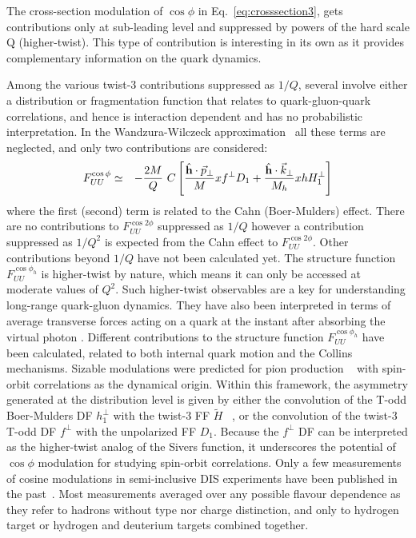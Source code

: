 \documentclass[aps,prl,twocolumn,showpacs,superscriptaddress,groupedaddress]{revtex4}  %
\newcommand{\FUUc}{F_{UU}^{\cos\phi}}
\newcommand{\FUUcc}{F_{UU}^{\cos2\phi}}
\newcommand{\kt}{\vec{k}_\perp}
\newcommand{\pt}{\vec{p}_\perp}
\newcommand{\ph}{\phi_h}
\begin{document}
The cross-section modulation of  $\cos \phi $ in Eq.~\ref{eq:crosssection3}, gets contributions only
at sub-leading level and suppressed by powers of the hard scale Q (higher-twist).
This type of contribution is interesting in its own as it provides complementary information
on the quark dynamics.

Among the various twist-3 contributions suppressed as $1/Q$, several involve
either a distribution or fragmentation function that relates to
quark-gluon-quark correlations, and hence is interaction dependent and has no probabilistic
interpretation. In the Wandzura-Wilczeck approximation~\cite{Wandzura:1977qf}
all these terms are neglected, and only two contributions are considered: %
\begin{eqnarray} \nonumber
\label{Eq:cosphi}
\FUUc & \simeq & -\frac{2M}{Q}\  C\left[\frac{ \hat{\bf h} \cdot \pt}{M} xf^\perp D_1 +
\frac{\hat{\bf h} \cdot \kt}{M_h} 
xh H_1^\perp \right] \\
\end{eqnarray}
where the first (second) term is related to the Cahn (Boer-Mulders) effect.
There are no contributions to $\FUUcc$ suppressed as $1/Q$ however a contribution suppressed as $1/Q^2$ is expected from the Cahn effect to $\FUUcc$.
Other contributions beyond $1/Q$ have not been calculated yet.
The structure function $F^{\cos \ph}_{UU}$ is higher-twist by nature, which means it can only be accessed at moderate values of $Q^2$.
Such higher-twist observables are a key for understanding long-range quark-gluon dynamics.
They have also been interpreted in terms of average transverse forces acting on a quark at the instant after absorbing the virtual photon \cite{Burkardt:2008vd}.
Different contributions to the structure function  $F^{\cos \ph}_{UU}$ have been calculated, related to both internal quark motion and the Collins mechanisms.
Sizable modulations  were predicted for pion production ~\cite{Anselmino:2005nn} with spin-orbit correlations   as the dynamical origin.
Within this framework, the asymmetry generated at the distribution level is given by either the convolution of the T-odd Boer-Mulders DF $h_1^{\perp}$ with the twist-3 FF $\tilde{H}$ ~\cite{Bacchetta:2006tn}, or the convolution of the  twist-3 T-odd DF $f^\perp$ with the unpolarized FF $D_1$\cite{Metz:2004je}.
Because the $f^\perp$ DF can be interpreted as the higher-twist analog of the Sivers function, it underscores the potential of $\cos\phi$ modulation for studying spin-orbit correlations. 
Only a few measurements of cosine modulations in semi-inclusive DIS experiments have been published in the past~\cite{Aubert:1983cz,Arneodo:1986cf,Adams:1993hs,Breitweg:2000qh}.
Most measurements averaged over any possible flavour dependence as they refer to hadrons without type nor charge distinction, and only to hydrogen target or hydrogen and deuterium targets combined together.
\end{document}
